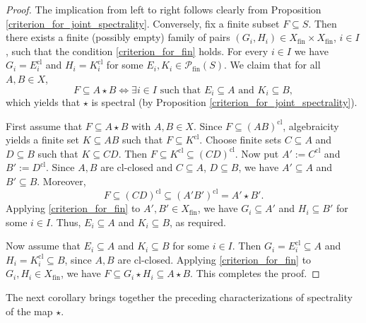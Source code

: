 \documentclass[10pt, reqno]{amsart}
\theoremstyle{plain}
\theoremstyle{definition}
\begin{document}
\begin{proof}
    The implication from left to right follows clearly from Proposition \ref{criterion_for_joint_spectrality}. Conversely, fix a finite subset $F \subseteq S$. Then there exists a finite (possibly empty) family of pairs $(G_i, H_i) \in X_\mathrm{fin} \times X_\mathrm{fin}$, $i \in I$, such that the condition \eqref{criterion_for_fin} holds. For every $i\in I$ we have $G_i = E_i^\mathrm{cl}$ and $H_i = K_i^\mathrm{cl}$ for some $E_i, K_i \in \mathcal{P}_\mathrm{fin}(S)$. We claim that for all $A, B \in X$, 
    \begin{equation*}
        F \subseteq A \star B \iff \exists i\in I \text{ such that } E_i \subseteq A \text{ and } K_i \subseteq B, 
    \end{equation*}
    which yields that $\star$ is spectral (by Proposition \ref{criterion_for_joint_spectrality}). 
    
    First assume that $F \subseteq A \star B$ with $A, B \in X$. Since $F \subseteq (AB)^\mathrm{cl}$, algebraicity yields a finite set $K \subseteq AB$ such that $F\subseteq K^\mathrm{cl}$. Choose finite sets $C\subseteq A$ and $D\subseteq B$ such that $K\subseteq CD$. Then $F \subseteq K^\mathrm{cl} \subseteq (CD)^\mathrm{cl}$. Now put $A' := C^\mathrm{cl}$ and $B' := D^\mathrm{cl}$. Since $A, B$ are $\mathrm{cl}$-closed and $C \subseteq A$, $D \subseteq B$, we have $A' \subseteq A$ and $B' \subseteq B$. Moreover, $$F \subseteq (CD)^\mathrm{cl} \subseteq (A'B')^\mathrm{cl} =A'\star B'.$$ Applying \eqref{criterion_for_fin} to $A', B' \in X_\mathrm{fin}$, we have $G_i \subseteq A'$ and $H_i \subseteq B'$ for some $i \in I$. Thus, $E_i \subseteq A$ and $K_i \subseteq B$, as required. 
    
    Now assume that $E_i \subseteq A$ and $K_i \subseteq B$ for some $i\in I$. Then $G_i = E_i^\mathrm{cl} \subseteq A$ and $H_i = K_i^\mathrm{cl} \subseteq B$, since $A, B$ are $\mathrm{cl}$-closed. Applying \eqref{criterion_for_fin} to $G_i, H_i\in X_\mathrm{fin}$, we have $F \subseteq G_i \star H_i \subseteq A \star B$. This completes the proof. 
\end{proof}
The next corollary brings together the preceding characterizations of spectrality of the map $\star$. 
\end{document}
